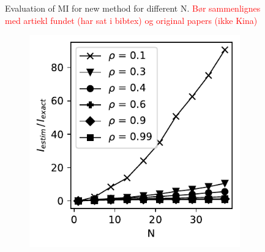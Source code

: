 \documentclass[../Thesis.tex]{subfiles}
\begin{document}
\begin{figure}[h]
\begin{subfigure}[t]{0.49\textwidth}
        \caption{}
        \label{subfig:new MI method all zoom}
    \end{subfigure}
    \caption{Evaluation of MI for new method for different N. \textcolor{red}{Bør sammenlignes med artiekl fundet (har sat i bibtex) og original papers (ikke Kina)}}
    \label{fig:dd}
\end{figure}

\begin{figure}[h]
    \centering
    \begin{subfigure}[t]{0.32\textwidth}
        \centering
        \includegraphics[width=\linewidth]{figures/ND examples/MI calc/gaussian example original all.pdf}
        \caption{}
        \label{subfig:d}
    \end{subfigure}%
    ~
    \begin{subfigure}[t]{0.32\textwidth}
        \centering

\end{subfigure}
\end{figure}
\end{document}
